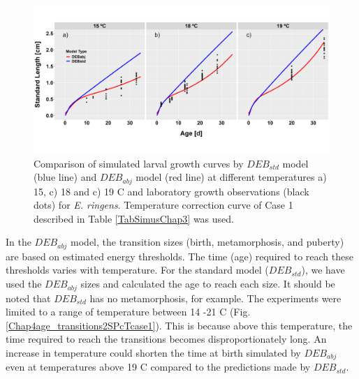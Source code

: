 \begin{figure}[ht]
	\includegraphics[width=1.0\textwidth]{figures/Chap4DEBoutVSArturoLabf1V4.png}
	\centering
	\caption{Comparison of simulated larval growth curves by $DEB_{std}$ model (blue line) and $DEB_{abj}$ model (red line) at different temperatures a) 15, c) 18 and c) 19 \textdegree C and laboratory growth observations (black dots) for \textit{E. ringens}. Temperature correction curve of Case 1 described in Table \ref{TabSimusChap3} was used.}
	\label{Chap4DEBoutVSArturoLabf1V4}
\end{figure}

In the $DEB_{abj}$ model, the transition sizes (birth, metamorphosis, and puberty) are based on estimated energy thresholds. The time (age) required to reach these thresholds varies with temperature. For the standard model ($DEB_{std}$), we have used the $DEB_{abj}$ sizes and calculated the age to reach each size. It should be noted that $DEB_{std}$ has no metamorphosis, for example. The experiments were limited to a range of temperature between 14 -21 \textdegree C (Fig. \ref{Chap4age_transitions2SPcTcase1}). This is because above this temperature, the time required to reach the transitions becomes disproportionately long. An increase in temperature could shorten the time at birth simulated by $DEB_{abj}$ even at temperatures above 19 \textdegree C compared to the predictions made by $DEB_{std}$.\\

